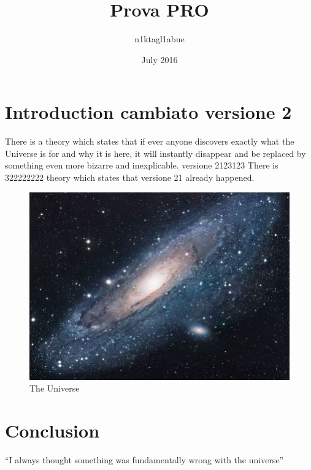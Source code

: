 \documentclass{article}
\title{Prova PRO}
\author{n1ktagl1abue }
\date{July 2016}
\begin{document}
\maketitle

\section{Introduction cambiato versione 2}
There is a theory which states that if ever anyone discovers exactly what the Universe is for and why it is here, it will instantly disappear and be replaced by something even more bizarre and inexplicable.
versione 2123123
There is 322222222 theory which states that versione 21 already happened.

\begin{figure}[h!]
\centering
\includegraphics[scale=1.7]{universe.jpg}
\caption{The Universe}
\label{fig:univerise}
\end{figure}

\section{Conclusion}
``I always thought something was fundamentally wrong with the universe'' \citep{adams1995hitchhiker}



\end{document}
